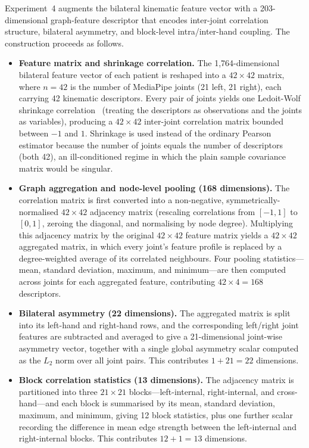 Experiment~4 augments the bilateral kinematic feature vector with a 203-dimensional graph-feature descriptor that encodes inter-joint correlation structure, bilateral asymmetry, and block-level intra/inter-hand coupling. The construction proceeds as follows.

\begin{itemize}
    \item \textbf{Feature matrix and shrinkage correlation.} The 1,764-dimensional bilateral feature vector of each patient is reshaped into a $42 \times 42$ matrix, where $n=42$ is the number of MediaPipe joints (21 left, 21 right), each carrying 42 kinematic descriptors. Every pair of joints yields one Ledoit-Wolf shrinkage correlation~\cite{ledoit2004well} (treating the descriptors as observations and the joints as variables), producing a $42 \times 42$ inter-joint correlation matrix bounded between $-1$ and $1$. Shrinkage is used instead of the ordinary Pearson estimator because the number of joints equals the number of descriptors (both 42), an ill-conditioned regime in which the plain sample covariance matrix would be singular.

    \item \textbf{Graph aggregation and node-level pooling (168 dimensions).} The correlation matrix is first converted into a non-negative, symmetrically-normalised $42 \times 42$ adjacency matrix (rescaling correlations from $[-1,1]$ to $[0,1]$, zeroing the diagonal, and normalising by node degree). Multiplying this adjacency matrix by the original $42 \times 42$ feature matrix yields a $42 \times 42$ aggregated matrix, in which every joint's feature profile is replaced by a degree-weighted average of its correlated neighbours. Four pooling statistics---mean, standard deviation, maximum, and minimum---are then computed across joints for each aggregated feature, contributing $42 \times 4 = 168$ descriptors.

    \item \textbf{Bilateral asymmetry (22 dimensions).} The aggregated matrix is split into its left-hand and right-hand rows, and the corresponding left/right joint features are subtracted and averaged to give a 21-dimensional joint-wise asymmetry vector, together with a single global asymmetry scalar computed as the $L_2$ norm over all joint pairs. This contributes $1 + 21 = 22$ dimensions.

    \item \textbf{Block correlation statistics (13 dimensions).} The adjacency matrix is partitioned into three $21 \times 21$ blocks---left-internal, right-internal, and cross-hand---and each block is summarised by its mean, standard deviation, maximum, and minimum, giving 12 block statistics, plus one further scalar recording the difference in mean edge strength between the left-internal and right-internal blocks. This contributes $12 + 1 = 13$ dimensions.
\end{itemize}

